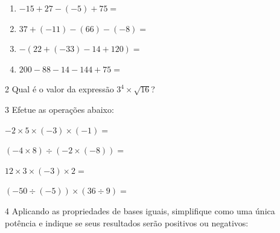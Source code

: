 \begin{enumerate}[itemsep=-5mm]
    \item $- 15 + 27 - (- 5) + 75 = $ 

    \item $37 + (- 11) - (66) - ( - 8) =$

    \item $- (22 + ( - 33 ) - 14 + 120) =$

    \item $200 - 88 - 14 - 144 + 75 =$

\end{enumerate}


\num{2} Qual é o valor da expressão $3^4 \times \sqrt{16}$?


\reduline{\ \hfill}

\num{3} Efetue as operações abaixo:

\begin{escolha}[itemsep=0pt]

\item $- 2 \times 5 \times ( - 3 ) \times ( - 1 ) =$ 
\item $(- 4 \times 8) \div ( - 2 \times ( - 8 )) =$ 
\item $12 \times 3 \times ( - 3 ) \times 2 =$ 
\item $( - 50 \div ( - 5 )) \times (36 \div 9) =$ 

\end{escolha}

\pagebreak

\num{4} Aplicando as propriedades de bases iguais, simplifique como uma única
potência e indique se seus resultados serão positivos ou negativos:

